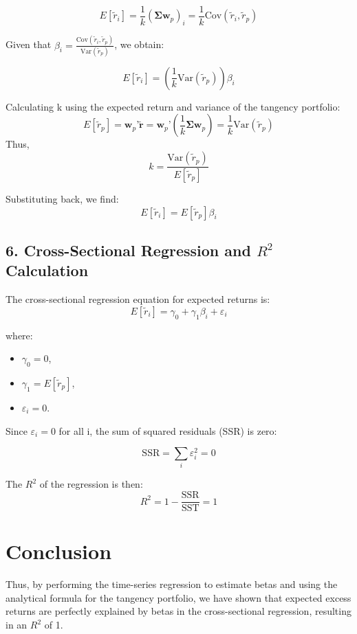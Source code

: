 \documentclass{article}
\begin{document}
\begin{equation}
E[\tilde{r}_i] = \frac{1}{k} (\boldsymbol{\Sigma} \mathbf{w}_p)_i = \frac{1}{k} \text{Cov}(\tilde{r}_i, \tilde{r}_p)
\end{equation}

Given that $\beta_i = \frac{\text{Cov}(\tilde{r}_i, \tilde{r}_p)}{\text{Var}(\tilde{r}_p)}$, we obtain:

\begin{equation}
E[\tilde{r}_i] = \left( \frac{1}{k} \text{Var}(\tilde{r}_p) \right) \beta_i
\end{equation}

Calculating k using the expected return and variance of the tangency portfolio:
\begin{equation}
E[\tilde{r}_p] = \mathbf{w}_p’ \tilde{\mathbf{r}} = \mathbf{w}_p’ \left( \frac{1}{k} \boldsymbol{\Sigma} \mathbf{w}_p \right) = \frac{1}{k} \text{Var}(\tilde{r}_p)
\end{equation}
Thus,
\begin{equation}
k = \frac{\text{Var}(\tilde{r}_p)}{E[\tilde{r}_p]}
\end{equation}

Substituting back, we find:
\begin{equation}
E[\tilde{r}_i] = E[\tilde{r}_p] \beta_i
\end{equation}

\subsection*{6. Cross-Sectional Regression and $R^2$ Calculation}

The cross-sectional regression equation for expected returns is:
\begin{equation}
E[\tilde{r}_i] = \gamma_0 + \gamma_1 \beta_i + \varepsilon_i
\end{equation}

where:
\begin{itemize}
\item $\gamma_0 = 0$,
\item $\gamma_1 = E[\tilde{r}_p]$,
\item $\varepsilon_i = 0$.
\end{itemize}

Since $\varepsilon_i = 0$ for all i, the sum of squared residuals (SSR) is zero:

\begin{equation}
\text{SSR} = \sum_{i} \varepsilon_i^2 = 0
\end{equation}

The $R^2$ of the regression is then:
\begin{equation}
R^2 = 1 - \frac{\text{SSR}}{\text{SST}} = 1
\end{equation}

\section*{Conclusion}

Thus, by performing the time-series regression to estimate betas and using the analytical formula for the tangency portfolio, we have shown that expected excess returns are perfectly explained by betas in the cross-sectional regression, resulting in an $R^2$ of 1.
\end{document}
